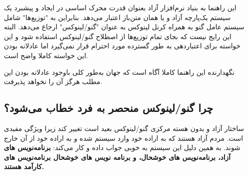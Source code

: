 \begin{note}
این راهنما به بنیاد نرم‌افزار آزاد
بعنوان قدرت محرک اساسی در ایجاد و پیشبرد یک سیستم یک‌پارچه آزاد و یا همان متن‌باز اعتبار می‌دهد. بنابراین به "توزیع‌ها" شامل سیستم عامل گنو به همراه کرنل لینوکس به عنوان "گنو/لینوکس" ارجاع می‌دهد. البته این رایج نیست که بجای تمام توزیع‌ها از اصطلاح گنو/لینوکس استفاده شود و این خواسته
برای اعتباردهی به طور گسترده مورد احترام قرار نمی‌گیرد اما عادلانه بودن این خواسته کاملا واضح است.
\end{note}


\begin{note}
نگهدارنده این راهنما کاملا آگاه است که جهان به‌طور کلی باوجود عادلانه بودن این مطلب هرگز آن را نخواهد پذیرفت.
\end{note}

\subsection{چرا گنو/لینوکس منحصر به فرد خطاب می‌شود؟}

ساختار آزاد و بدون هسته مرکزی گنو/لینوکس بعید است تغییر کند زیرا ویژگی مفیدی است. مردم آزاد هستند که به اراده خود وارد سیستم شده و به اراده خود از آن خارج شوند. به همین دلیل این سیستم به خوبی جواب داده و کار می‌کند:
{\bfseries
برنامه‌نویس های آزاد، برنامه‌نویس های خوشحال، و برنامه نویس های خوشحال برنامه‌نویس های کارآمد هستند.
}

